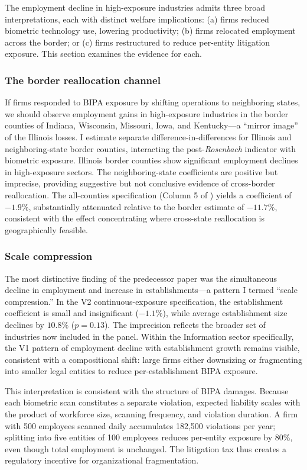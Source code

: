 \documentclass[12pt]{article}
\begin{document}
The employment decline in high-exposure industries admits three broad interpretations, each with distinct welfare implications: (a) firms reduced biometric technology use, lowering productivity; (b) firms relocated employment across the border; or (c) firms restructured to reduce per-entity litigation exposure. This section examines the evidence for each.

\subsubsection*{The border reallocation channel} If firms responded to BIPA exposure by shifting operations to neighboring states, we should observe employment gains in high-exposure industries in the border counties of Indiana, Wisconsin, Missouri, Iowa, and Kentucky---a ``mirror image'' of the Illinois losses. I estimate separate difference-in-differences for Illinois and neighboring-state border counties, interacting the post-\textit{Rosenbach} indicator with biometric exposure. Illinois border counties show significant employment declines in high-exposure sectors. The neighboring-state coefficients are positive but imprecise, providing suggestive but not conclusive evidence of cross-border reallocation. The all-counties specification (Column 5 of ) yields a coefficient of $-1.9\%$, substantially attenuated relative to the border estimate of $-11.7\%$, consistent with the effect concentrating where cross-state reallocation is geographically feasible.

\subsubsection*{Scale compression} The most distinctive finding of the predecessor paper was the simultaneous decline in employment and increase in establishments---a pattern I termed ``scale compression.'' In the V2 continuous-exposure specification, the establishment coefficient is small and insignificant ($-1.1\%$), while average establishment size declines by $10.8\%$ ($p = 0.13$). The imprecision reflects the broader set of industries now included in the panel. Within the Information sector specifically, the V1 pattern of employment decline with establishment growth remains visible, consistent with a compositional shift: large firms either downsizing or fragmenting into smaller legal entities to reduce per-establishment BIPA exposure.

This interpretation is consistent with the structure of BIPA damages. Because each biometric scan constitutes a separate violation, expected liability scales with the product of workforce size, scanning frequency, and violation duration. A firm with 500 employees scanned daily accumulates 182,500 violations per year; splitting into five entities of 100 employees reduces per-entity exposure by 80\%, even though total employment is unchanged. The litigation tax thus creates a regulatory incentive for organizational fragmentation.
\end{document}

